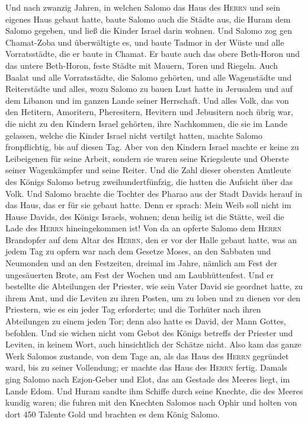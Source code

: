  Und nach zwanzig Jahren, in welchen Salomo das Haus des
\textsc{Herrn} und sein eigenes Haus gebaut hatte,  baute
Salomo auch die Städte aus, die Huram dem Salomo gegeben, und ließ die
Kinder Israel darin wohnen.  Und Salomo zog gen
Chamat-Zoba und überwältigte es,  und baute Tadmor in der
Wüste und alle Vorratsstädte, die er baute in Chamat.  Er
baute auch das obere Beth-Horon und das untere Beth-Horon, feste Städte
mit Mauern, Toren und Riegeln.  Auch Baalat und alle
Vorratsstädte, die Salomo gehörten, und alle Wagenstädte und
Reiterstädte und alles, wozu Salomo zu bauen Lust hatte in Jerusalem und
auf dem Libanon und im ganzen Lande seiner Herrschaft. 
Und alles Volk, das von den Hetitern, Amoritern, Pheresitern, Hevitern
und Jebusitern noch übrig war, die nicht zu den Kindern Israel gehörten,
 ihre Nachkommen, die sie im Lande gelassen, welche die
Kinder Israel nicht vertilgt hatten, machte Salomo fronpflichtig, bis
auf diesen Tag.  Aber von den Kindern Israel machte er
keine zu Leibeigenen für seine Arbeit, sondern sie waren seine
Kriegsleute und Oberste seiner Wagenkämpfer und seine Reiter.
 Und die Zahl dieser obersten Amtleute des Königs Salomo
betrug zweihundertfünfzig, die hatten die Aufsicht über das Volk.
 Und Salomo brachte die Tochter des Pharao aus der Stadt
Davids herauf in das Haus, das er für sie gebaut hatte. Denn er sprach:
Mein Weib soll nicht im Hause Davids, des Königs Israels, wohnen; denn
heilig ist die Stätte, weil die Lade des \textsc{Herrn} hineingekommen
ist!  Von da an opferte Salomo dem \textsc{Herrn}
Brandopfer auf dem Altar des \textsc{Herrn}, den er vor der Halle gebaut
hatte,  was an jedem Tag zu opfern war nach dem Gesetze
Moses, an den Sabbaten und Neumonden und an den Festzeiten, dreimal im
Jahre, nämlich am Fest der ungesäuerten Brote, am Fest der Wochen und am
Laubhüttenfest.  Und er bestellte die Abteilungen der
Priester, wie sein Vater David sie geordnet hatte, zu ihrem Amt, und die
Leviten zu ihren Posten, um zu loben und zu dienen vor den Priestern,
wie es ein jeder Tag erforderte; und die Torhüter nach ihren Abteilungen
zu einem jeden Tor; denn also hatte es David, der Mann Gottes, befohlen.
 Und sie wichen nicht vom Gebot des Königs betreffs der
Priester und Leviten, in keinem Wort, auch hinsichtlich der Schätze
nicht.  Also kam das ganze Werk Salomos zustande, von dem
Tage an, als das Haus des \textsc{Herrn} gegründet ward, bis zu seiner
Vollendung; er machte das Haus des \textsc{Herrn} fertig.
 Damals ging Salomo nach Ezjon-Geber und Elot, das am
Gestade des Meeres liegt, im Lande Edom.  Und Huram
sandte ihm Schiffe durch seine Knechte, die des Meeres kundig waren; die
fuhren mit den Knechten Salomos nach Ophir und holten von dort 450
Talente Gold und brachten es dem König Salomo.

